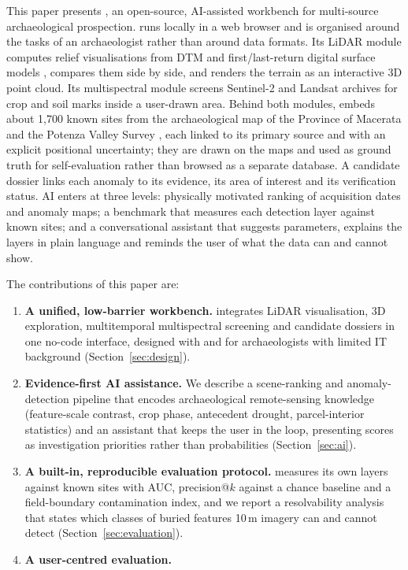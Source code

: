 This paper presents \airch{}, an open-source, AI-assisted workbench for multi-source archaeological prospection. \airch{} runs locally in a web browser and is organised around the tasks of an archaeologist rather than around data formats. Its LiDAR module computes relief visualisations from DTM and first/last-return digital surface models \citep{kokalj2016rvt}, compares them side by side, and renders the terrain as an interactive 3D point cloud. Its multispectral module screens Sentinel-2 and Landsat archives for crop and soil marks inside a user-drawn area. Behind both modules, \airch{} embeds about 1,700 known sites from the archaeological map of the Province of Macerata \citep{perna2024camm} and the Potenza Valley Survey \citep{vermeulen2017pvs}, each linked to its primary source and with an explicit positional uncertainty; they are drawn on the maps and used as ground truth for self-evaluation rather than browsed as a separate database. A candidate dossier links each anomaly to its evidence, its area of interest and its verification status. AI enters \airch{} at three levels: physically motivated ranking of acquisition dates and anomaly maps; a benchmark that measures each detection layer against known sites; and a conversational assistant that suggests parameters, explains the layers in plain language and reminds the user of what the data can and cannot show. 

The contributions of this paper are:
\begin{enumerate}
  \item \textbf{A unified, low-barrier workbench.} \airch{} integrates LiDAR visualisation, 3D exploration, multitemporal multispectral screening and candidate dossiers in one no-code interface, designed with and for archaeologists with limited IT background (Section~\ref{sec:design}).
  \item \textbf{Evidence-first AI assistance.} We describe a scene-ranking and anomaly-detection pipeline that encodes archaeological remote-sensing knowledge (feature-scale contrast, crop phase, antecedent drought, parcel-interior statistics) and an assistant that keeps the user in the loop, presenting scores as investigation priorities rather than probabilities (Section~\ref{sec:ai}).
  \item \textbf{A built-in, reproducible evaluation protocol.} \airch{} measures its own layers against known sites with AUC, precision@$k$ against a chance baseline and a field-boundary contamination index, and we report a resolvability analysis that states which classes of buried features 10\,m imagery can and cannot detect (Section~\ref{sec:evaluation}).
  \item \textbf{A user-centred evaluation.} 
\end{enumerate}


